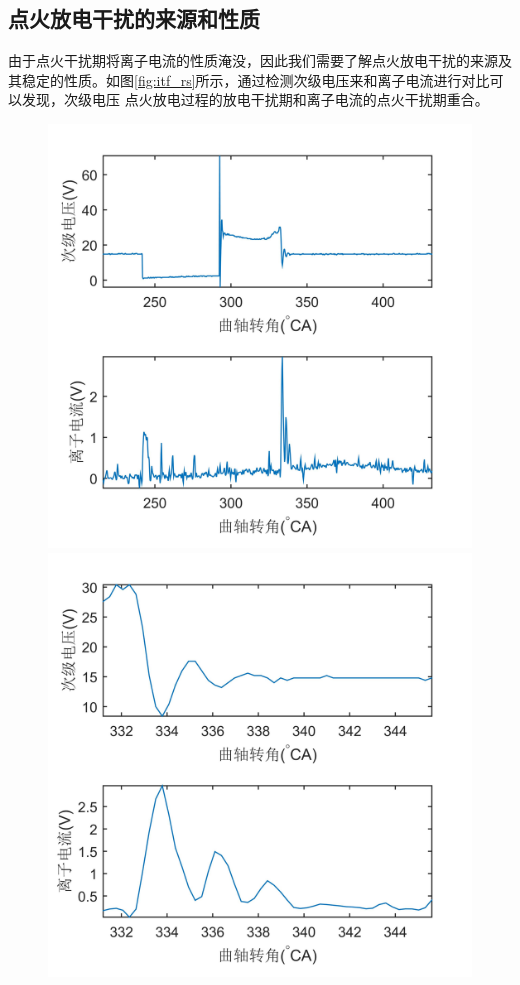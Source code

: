 \subsection{点火放电干扰的来源和性质}
由于点火干扰期将离子电流的性质淹没，因此我们需要了解点火放电干扰的来源及其稳定的性质。如图\ref{fig:itf_rs}所示，通过检测次级电压来和离子电流进行对比可以发现，次级电压
点火放电过程的放电干扰期和离子电流的点火干扰期重合。
\begin{figure}[H]
\begin{minipage}{0.5\linewidth}
	\centering
	\includegraphics[width = \textwidth]{thesis_figure/ion_chapter/interfere_reason}
\end{minipage}
\begin{minipage}{0.5\linewidth}
	\centering
	\includegraphics[width = \textwidth]{thesis_figure/ion_chapter/itf_rs}

\end{minipage}
\end{figure}
